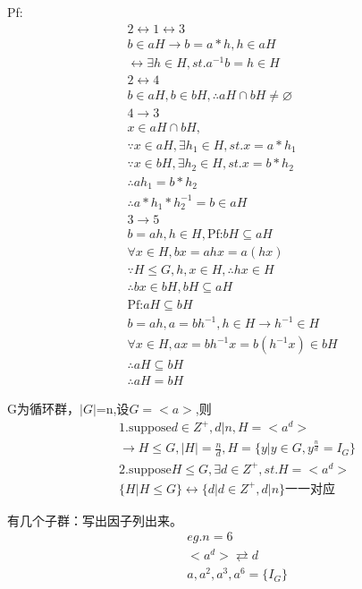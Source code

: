 \documentclass[12pt, a4paper]{article}  %
\begin{document}
Pf:
\begin{align}
    &2\leftrightarrow 1 \leftrightarrow 3\\
    &b\in aH\rightarrow b=a*h,h\in aH\\
    &\leftrightarrow \exists h\in H,st. a^{-1}b=h\in H
    &\\
    &2\leftrightarrow 4\\
    &b\in aH,b\in bH,\therefore aH\cap bH\neq \varnothing\\
    &4\rightarrow 3\\
    &x\in aH\cap bH,\\
    &\because x\in aH,\exists h_1\in H,st. x=a*h_1\\
    &\because x\in bH,\exists h_2\in H,st. x=b*h_2\\
    &\therefore ah_1=b*h_2\\
    &\therefore a*h_1*h_2^{-1}=b\in aH\\
    &3\rightarrow 5\\
    &b=ah,h\in H,\text{Pf:}bH\subseteq aH\\
    &\forall x\in H,bx=ahx=a(hx)\\
    &\because H\leqslant G,h,x\in H,\therefore hx\in H\\
    &\therefore bx\in bH,bH\subseteq aH\\
    &\text{Pf:}aH\subseteq bH\\
    &b=ah,a=bh^{-1},h\in H\rightarrow h^{-1}\in H\\
    &\forall x\in H,ax=bh^{-1}x=b(h^{-1}x)\in bH\\
    &\therefore aH\subseteq bH\\
    &\therefore aH=bH
\end{align}

G为循环群，\(|G|\)=n,设\(G=<a>\),则
\begin{align}
    &1.\text{suppose} d \in Z^{+},d|n,H=<a^d>\\
    &\rightarrow H\leqslant G,|H|=\frac{n}{d},H=\{y|y\in G,y^{\frac{n}{d}}=I_G\}\\
    &2. \text{suppose} H\leqslant G,\exists d\in Z^{+},st.H=<a^d>\\
    &\{H|H\leqslant G\} \leftrightarrow \{d|d\in Z^{+},d|n\}\text{一一对应}
\end{align}

有几个子群：写出因子列出来。
\begin{align}
    &eg.n=6\\
    &<a^d>\rightleftarrows d\\
    & a, a^2, a^3, a^6=\{I_G\}
\end{align}
\end{document}
